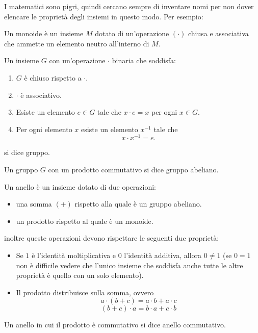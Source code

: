 \documentclass[11pt]{scrartcl}
\begin{document}
	I matematici sono pigri, quindi cercano sempre di inventare nomi per non dover elencare le proprietà degli insiemi in questo modo. Per esempio:
	\begin{definition}[Monoide]
		Un monoide è un insieme $M$ dotato di un'operazione $(\cdot)$ chiusa e associativa che ammette un elemento neutro all'interno di $M$.
	\end{definition}
	\begin{definition}[Gruppo]
		Un insieme $G$ con un'operazione $\cdot$ binaria che soddisfa:
		\begin{enumerate}
			\item $G$ è chiuso rispetto a $\cdot$.
			\item $\cdot$ è associativo. 
			\item Esiste un elemento $e\in G$ tale che $x\cdot e=x$ per ogni $x\in G$.
			\item Per ogni elemento $x$ esiste un elemento $x^{-1}$ tale che $$x\cdot x^{-1}=e.$$
		\end{enumerate}
		si dice gruppo.
	\end{definition}
	\begin{definition}
		Un gruppo $G$ con un prodotto commutativo si dice gruppo abeliano.
	\end{definition}
	\begin{definition}[Anello]
		Un anello è un insieme dotato di due operazioni:
		\begin{itemize}
			\item una somma $(+)$ rispetto alla quale è un gruppo abeliano.
			\item un prodotto rispetto al quale è un monoide.
		\end{itemize}
		inoltre queste operazioni devono rispettare le seguenti due proprietà:
		\begin{itemize}
			\item Se $1$ è l'identità moltiplicativa e $0$ l'identità additiva, allora $0\ne 1$ (se $0=1$ non è difficile vedere che l'unico insieme che soddisfa anche tutte le altre proprietà è quello con un solo elemento).
			\item Il prodotto distribuisce sulla somma, ovvero
			$$a\cdot(b+c)=a\cdot b + a \cdot c$$
			$$(b+c)\cdot a=b\cdot a + c \cdot b$$
		\end{itemize}
	\end{definition}
	\begin{definition}
		Un anello in cui il prodotto è commutativo si dice anello commutativo.
	\end{definition}
\end{document}

